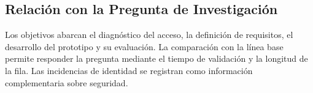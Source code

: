 \ifdefined\soloproblemaobjetivos\else\ifdefined\soloobjetivos\else\ifdefined\soloprotocolo\else
\subsection{Relación con la Pregunta de Investigación}
Los objetivos abarcan el diagnóstico del acceso, la definición de requisitos,
el desarrollo del prototipo y su evaluación. La comparación con la línea base
permite responder la pregunta mediante el tiempo de validación y la longitud
de la fila. Las incidencias de identidad se registran como información
complementaria sobre seguridad.
\fi\fi\fi
